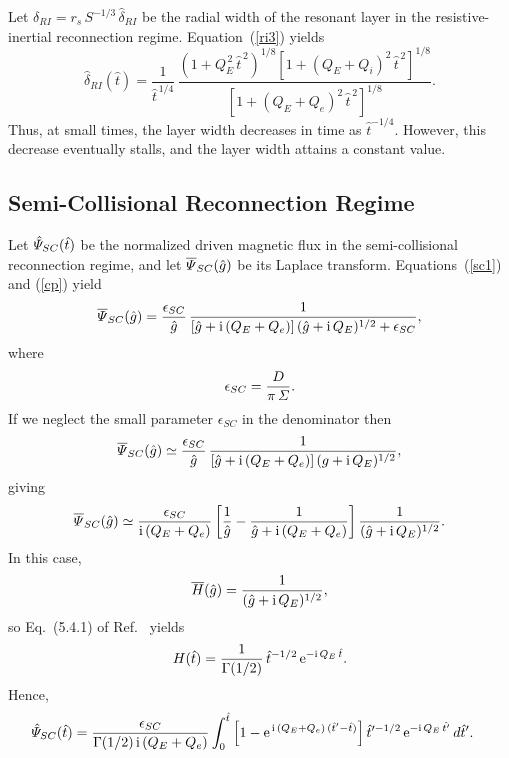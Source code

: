 \documentclass[12pt,prb,aps]{revtex4-1}
\begin{document}
Let $\delta_{RI} =r_s\,S^{-1/3}\,\hat{\delta}_{RI}$ be the radial width of the resonant layer in the resistive-inertial reconnection regime. Equation~(\ref{ri3})
yields 
\begin{equation}
\hat{\delta}_{RI}(\hat{t}) =\frac{1}{\hat{t}^{\,1/4}}\,\frac{\left(1+ Q_E^{\,2}\,\hat{t}^{\,2}\right)^{1/8}\left[1+(Q_E+Q_i)^2\,\hat{t}^{\,2}\right]^{1/8}}
{\left[1+(Q_E+Q_e)^2\,\hat{t}^{\,2}\right]^{1/8}}.
\end{equation}
Thus, at small times, the layer width decreases in time as $\hat{t}^{-1/4}$. However, this decrease eventually stalls, and the
layer width attains a constant value. 

\subsection{Semi-Collisional Reconnection Regime}
Let $\hat{\mit\Psi}_{SC}(\hat{t})$ be the normalized driven magnetic flux in the semi-collisional reconnection regime, and let $\overline{\mit\Psi}_{SC}(\hat{g})$ be its Laplace transform.
Equations~(\ref{sc1}) and (\ref{cp}) yield 
\begin{equation}
\overline{\mit\Psi}_{SC}(\hat{g}) =\frac{\epsilon_{SC}}{\hat{g}}\,\frac{1}{[\hat{g}+ {\rm i}\,(Q_E+Q_e)]\,(\hat{g}+{\rm i} \,Q_E)^{1/2}
+\epsilon_{SC}},
\end{equation}
where
\begin{equation}
\epsilon_{SC}= \frac{D}{\pi\,{\mit\Sigma}}.
\end{equation}
If we neglect the small parameter $\epsilon_{SC}$ in the denominator then
\begin{equation} 
\overline{\mit\Psi}_{SC}(\hat{g}) \simeq \frac{\epsilon_{SC}}{\hat{g}}\,\frac{1}{[\hat{g}+ {\rm i}\,(Q_E+Q_e)]\,(g+{\rm i} \,Q_E)^{1/2}},
\end{equation}
giving 
\begin{equation}
\overline{\mit\Psi}_{SC}(\hat{g}) \simeq \frac{\epsilon_{SC}}{{\rm i}\,(Q_E+Q_e)}
\left[\frac{1}{\hat{g}}- \frac{1}{\hat{g}+ {\rm i}\,(Q_E+Q_e)}\right]\frac{1}{(\hat{g}+{\rm i} \,Q_E)^{1/2}}.
\end{equation}
In this case, 
\begin{equation}
\overline{H}(\hat{g}) = \frac{1}{(\hat{g}+{\rm i}\,Q_E)^{1/2}},
\end{equation}
so Eq.~(5.4.1) of Ref.~ yields
\begin{equation}
H(\hat{t}) = \frac{1}{\Gamma(1/2)}\,\hat{t}^{-1/2}\,{\rm e}^{-{\rm i}\,Q_E\,\hat{t}}.
\end{equation}
Hence,
\begin{align}\label{scpx}
\hat{\mit\Psi}_{SC}(\hat{t}) &= \frac{\epsilon_{SC}}{\Gamma(1/2)\,{\rm i}\,(Q_E+Q_e)} \int
_0^{\hat{t}}\left[1-{\rm e}^{\,{\rm i}\,(Q_E+Q_e)\,(\hat{t}'-\hat{t})}\right]
\hat{t}'^{-1/2}\,{\rm e}^{-{\rm i}\,Q_E\,\hat{t'}}\,d\hat{t}'.
\end{align}
\end{document}
